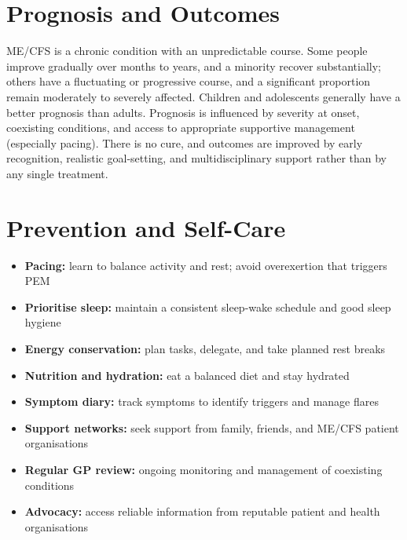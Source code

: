 \section*{Prognosis and Outcomes}
ME/CFS is a chronic condition with an unpredictable course. Some people improve gradually over months to years, and a minority recover substantially; others have a fluctuating or progressive course, and a significant proportion remain moderately to severely affected. Children and adolescents generally have a better prognosis than adults. Prognosis is influenced by severity at onset, coexisting conditions, and access to appropriate supportive management (especially pacing). There is no cure, and outcomes are improved by early recognition, realistic goal-setting, and multidisciplinary support rather than by any single treatment.

\section*{Prevention and Self-Care}
\begin{itemize}
    \item \textbf{Pacing:} learn to balance activity and rest; avoid overexertion that triggers PEM
    \item \textbf{Prioritise sleep:} maintain a consistent sleep-wake schedule and good sleep hygiene
    \item \textbf{Energy conservation:} plan tasks, delegate, and take planned rest breaks
    \item \textbf{Nutrition and hydration:} eat a balanced diet and stay hydrated
    \item \textbf{Symptom diary:} track symptoms to identify triggers and manage flares
    \item \textbf{Support networks:} seek support from family, friends, and ME/CFS patient organisations
    \item \textbf{Regular GP review:} ongoing monitoring and management of coexisting conditions
    \item \textbf{Advocacy:} access reliable information from reputable patient and health organisations
\end{itemize}

